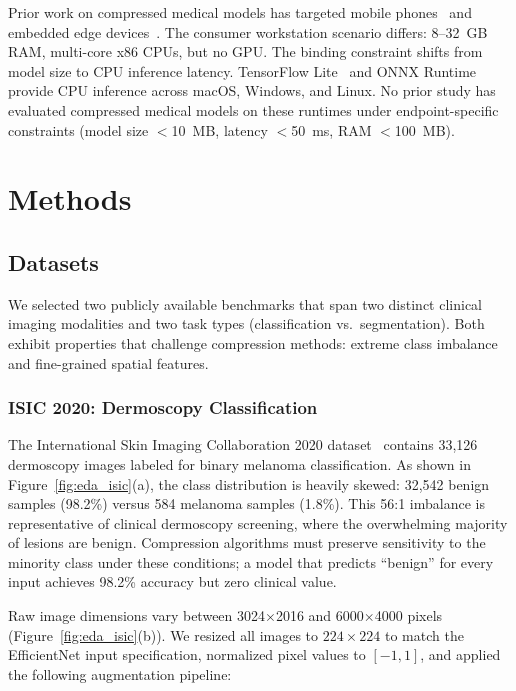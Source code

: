 \documentclass[10pt,twocolumn]{article}
\begin{document}
Prior work on compressed medical models has targeted mobile phones~\citep{pacheco2024compressed} and embedded edge devices~\citep{qayyum2023efficient}. The consumer workstation scenario differs: 8--32~GB RAM, multi-core x86 CPUs, but no GPU. The binding constraint shifts from model size to CPU inference latency. TensorFlow Lite~\citep{tflite2023} and ONNX Runtime~\citep{onnxruntime2023} provide CPU inference across macOS, Windows, and Linux. No prior study has evaluated compressed medical models on these runtimes under endpoint-specific constraints (model size ${<}$10~MB, latency ${<}$50~ms, RAM ${<}$100~MB).

\section{Methods}
\label{sec:methods}

\subsection{Datasets}
\label{sec:datasets}

We selected two publicly available benchmarks that span two distinct clinical imaging modalities and two task types (classification vs.\ segmentation). Both exhibit properties that challenge compression methods: extreme class imbalance and fine-grained spatial features.

\subsubsection{ISIC 2020: Dermoscopy Classification}

The International Skin Imaging Collaboration 2020 dataset~\citep{codella2019isic} contains 33,126 dermoscopy images labeled for binary melanoma classification. As shown in Figure~\ref{fig:eda_isic}(a), the class distribution is heavily skewed: 32,542 benign samples (98.2\%) versus 584 melanoma samples (1.8\%). This 56:1 imbalance is representative of clinical dermoscopy screening, where the overwhelming majority of lesions are benign. Compression algorithms must preserve sensitivity to the minority class under these conditions; a model that predicts ``benign'' for every input achieves 98.2\% accuracy but zero clinical value.

Raw image dimensions vary between 3024$\times$2016 and 6000$\times$4000 pixels (Figure~\ref{fig:eda_isic}(b)). We resized all images to $224{\times}224$ to match the EfficientNet input specification, normalized pixel values to $[-1, 1]$, and applied the following augmentation pipeline:
\end{document}
